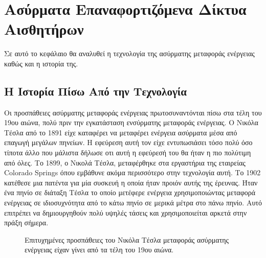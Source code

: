 

\chapter{Ασύρματα Επαναφορτιζόμενα Δίκτυα Αισθητήρων}\label{ch:wrsns}
Σε αυτό το κεφάλαιο θα αναλυθεί η τεχνολογία της ασύρματης μεταφοράς ενέργειας καθώς και η ιστορία της.
\section{Η Ιστορία Πίσω Από την Τεχνολογία}
Οι προσπάθειες ασύρματης μεταφοράς ενέργειας πρωτοσυναντόνται πίσω στα τέλη του 19ου αιώνα, πολύ πριν την εγκατάσταση ενσύρματης μεταφοράς ενέργειας. Ο Νικόλα Τέσλα
από το 1891 είχε καταφέρει να μεταφέρει ενέργεια ασύρματα μέσα από επαγωγή μεγάλων πηνείων. Η εφεύρεση αυτή τον είχε εντυπωσιάσει τόσο πολύ όσο τίποτα άλλο που
μάλιστα δήλωσε οτι αυτή η εφεύρεσή του θα ήταν η πιο πολύτιμη από όλες. Tο 1899, ο Νικολά Τέσλα, μεταφέρθηκε στα εργαστήρια της εταιρείας Colorado Springs όπου
εμβάθυνε ακόμα περισσότερο στην τεχνολογία αυτή. Το 1902 κατέθεσε μια πατέντα \cite{tesla_patent} για μία συσκευή η οποία ήταν προιόν αυτής της έρευνας. Ήταν ένα
πηνίο σε διάταξη Τέσλα το οποίο μετέφερε ενέργεια χρησιμοποιώντας μεταφορά ενέργειας σε ιδιοσυχνότητα από το κάτω πηνίο σε μερικά μέτρα στο πάνω πηνίο. Αυτό
επιτρέπει να δημιουργηθούν πολύ υψηλές τάσεις και χρησιμοποιείται αρκετά στην πράξη σήμερα.

\begin{figure}[h]
  \centering
  \caption{Επιτυχημένες προσπάθειες του Νικόλα Τέσλα μεταφοράς ασύρματης ενέργειας είχαν γίνει από τα τέλη του 19ου αιώνα.}
  \label{fig:tesla_eperiments}
\end{figure}

